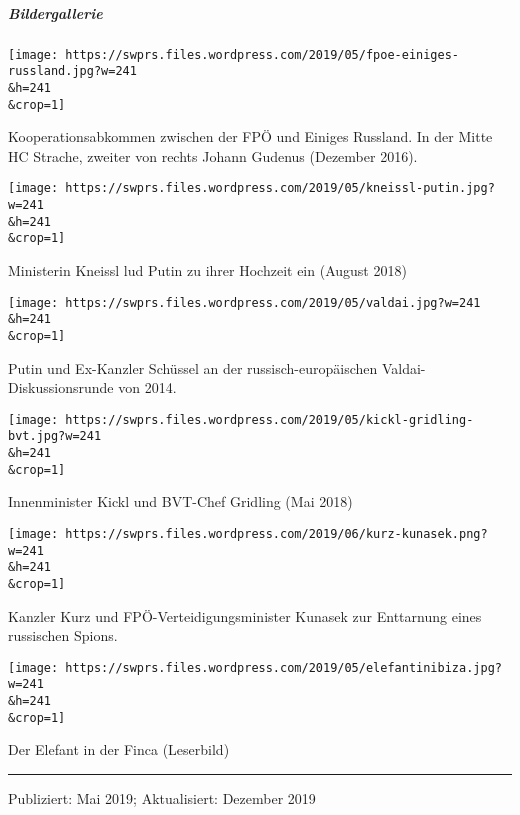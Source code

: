 \hypertarget{bildergallerie}{%
\subparagraph{\texorpdfstring{\textbf{Bildergallerie}}{Bildergallerie}}\label{bildergallerie}}

\href{https://swprs.org/ibiza-zusammenfassung/fpoe-einiges-russland/}{}

\texttt{[image: https://swprs.files.wordpress.com/2019/05/fpoe-einiges-russland.jpg?w=241\\\&h=241\\\&crop=1]}

Kooperationsabkommen zwischen der FPÖ und Einiges Russland. In der Mitte
HC Strache, zweiter von rechts Johann Gudenus (Dezember 2016).

\href{https://swprs.org/ibiza-zusammenfassung/kneissl-putin/}{}

\texttt{[image: https://swprs.files.wordpress.com/2019/05/kneissl-putin.jpg?w=241\\\&h=241\\\&crop=1]}

Ministerin Kneissl lud Putin zu ihrer Hochzeit ein (August 2018)

\href{https://swprs.org/ibiza-zusammenfassung/valdai/}{}

\texttt{[image: https://swprs.files.wordpress.com/2019/05/valdai.jpg?w=241\\\&h=241\\\&crop=1]}

Putin und Ex-Kanzler Schüssel an der russisch-europäischen
Valdai-Diskussionsrunde von 2014.

\href{https://swprs.org/ibiza-zusammenfassung/kickl-gridling-bvt/}{}

\texttt{[image: https://swprs.files.wordpress.com/2019/05/kickl-gridling-bvt.jpg?w=241\\\&h=241\\\&crop=1]}

Innenminister Kickl und BVT-Chef Gridling (Mai 2018)

\href{https://swprs.org/ibiza-zusammenfassung/kurz-kunasek/}{}

\texttt{[image: https://swprs.files.wordpress.com/2019/06/kurz-kunasek.png?w=241\\\&h=241\\\&crop=1]}

Kanzler Kurz und FPÖ-Verteidigungsminister Kunasek zur Enttarnung eines
russischen Spions.

\href{https://swprs.org/ibiza-zusammenfassung/elefantinibiza/}{}

\texttt{[image: https://swprs.files.wordpress.com/2019/05/elefantinibiza.jpg?w=241\\\&h=241\\\&crop=1]}

Der Elefant in der Finca (Leserbild)

\begin{center}\rule{0.5\linewidth}{\linethickness}\end{center}

Publiziert: Mai 2019; Aktualisiert: Dezember 2019

